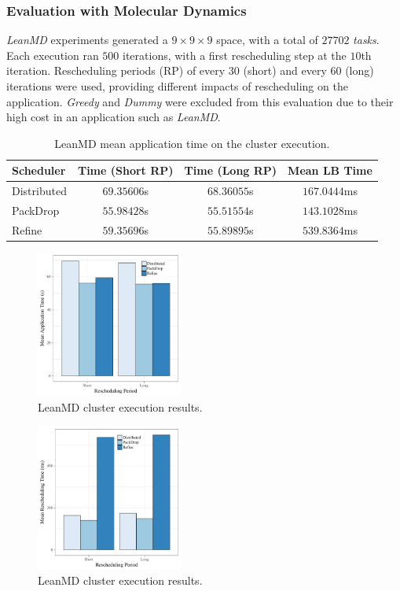 \subsubsection*{Evaluation with Molecular Dynamics}

\textit{LeanMD} experiments generated a $9\times9\times9$ space, with a total of $27702$ \textit{tasks}.
Each execution ran $500$ iterations, with a first rescheduling step at the $10$th iteration. 
Rescheduling periods (RP) of every $30$ (short) and every $60$ (long) iterations were used, providing different impacts of rescheduling on the application.
\textit{Greedy} and \textit{Dummy} were excluded from this evaluation due to their high cost in an application such as \textit{LeanMD}. 

\begin{table}[!ht]
	\centering
	\caption{LeanMD mean application time on the cluster execution.}	
	\begin{tabular}{l|c c c}
	Scheduler & Time (Short RP) & Time (Long RP) & Mean LB Time \\ \hline
	Distributed & $69.35606$s & $68.36055$s & $167.0444$ms \\ 
	PackDrop & $55.98428$s & $55.51554$s & $143.1028$ms \\ 
	Refine & $59.35696$s & $55.89895$s & $539.8364$ms \\ 
	\end{tabular}
	\label{tab:eval:g5k:leanmd:time} 
\end{table}

\begin{figure}[!ht]
	\centering
    \includegraphics[width=0.43\textwidth]{images/apptime_leanmd_g5k.pdf}
	\caption{LeanMD cluster execution results.}
    \label{fig:eval:g5k:leanmd:time}
\end{figure}

\begin{figure}[!ht]
	\centering
    \includegraphics[width=0.43\textwidth]{images/schedtime_leanmd_g5k.pdf}
	\caption{LeanMD cluster execution results.}
    \label{fig:eval:g5k:leanmd:schedtime}
\end{figure}

